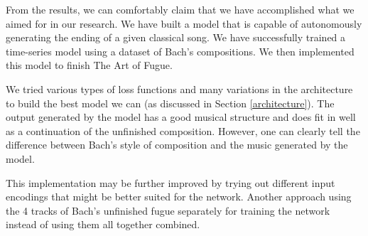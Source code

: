 \documentclass[11pt, twocolumn]{article}
\begin{document}
From the results, we can comfortably claim that we have accomplished what we aimed for in our research. We have built a model that is capable of autonomously generating the ending of a given classical song. We have successfully trained a time-series model using a dataset of Bach's compositions. We then implemented this model to finish The Art of Fugue.

We tried various types of loss functions and many variations in the architecture to build the best model we can (as discussed in Section \ref{architecture}). The output generated by the model has a good musical structure and does fit in well as a continuation of the unfinished composition. However, one can clearly tell the difference between Bach's style of composition and the music generated by the model.

This implementation may be further improved by trying out different input encodings that might be better suited for the network. Another approach using the 4 tracks of Bach's unfinished fugue separately for training the network instead of using them all together combined.



\end{document}
